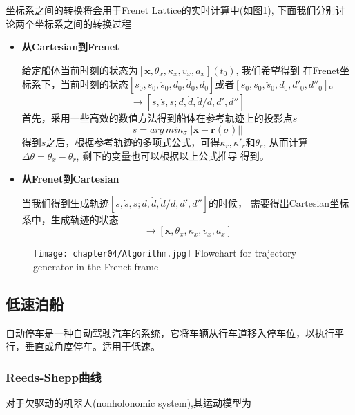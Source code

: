 坐标系之间的转换将会用于Frenet Lattice的实时计算中(如图\ref{fig:frenetalgorithm}),
下面我们分别讨论两个坐标系之间的转换过程
\begin{itemize}
  \item \textbf{从Cartesian到Frenet}

  给定船体当前时刻的状态为$[\bm{x},\theta_x, \kappa_x, v_x, a_x](t_0)$, 我们希望得到
  在Frenet坐标系下，当前时刻的状态$[s_0, \dot{s}_0, \ddot{s}_0, d_0, \dot{d}_0,
  \ddot{d}_0]$或者$[s_0, \dot{s}_0, \ddot{s}_0, d_0, d'_0, d''_0]$。
  \begin{equation}
    [\bm{x}, \theta_x, \kappa_x, v_x, a_x]  \rightarrow
    [s, \dot{s}, \ddot{s}; d, \dot{d},\ddot{d}/d, d', d'']
  \end{equation}
  首先，采用一些高效的数值方法得到船体在参考轨迹上的投影点$s$
  \begin{equation}
    s= arg\,min_{\sigma} || \bm{x}-\bm{r}(\sigma)||
  \end{equation}
  得到$s$之后，根据参考轨迹的多项式公式，可得${\kappa}_r, {\kappa}'_r$和${\theta}_r$,
  从而计算$\Delta \theta = {\theta}_x-{\theta}_r $, 剩下的变量也可以根据以上公式推导
  得到。

  \item \textbf{从Frenet到Cartesian}

  当我们得到生成轨迹$[s, \dot{s}, \ddot{s}; d, \dot{d},\ddot{d}/d, d', d'']$的时候，
  需要得出Cartesian坐标系中，生成轨迹的状态
  \begin{equation}
    [s, \dot{s}, \ddot{s}; d, \dot{d},\ddot{d}/d, d', d''] \rightarrow
    [\bm{x}, \theta_x, \kappa_x, v_x, a_x]
  \end{equation}

\end{itemize}

\begin{figure}[!htp]
  \centering
  \texttt{[image: chapter04/Algorithm.jpg]}
    {Flowchart for trajectory generator in the Frenet frame}
  \label{fig:frenetalgorithm}
\end{figure}


\subsection{低速泊船}
自动停车是一种自动驾驶汽车的系统，它将车辆从行车道移入停车位，以执行平行，垂直或角度停车。适用于低速。

\subsubsection{Reeds-Shepp曲线}
对于欠驱动的机器人(nonholonomic system),其运动模型为

